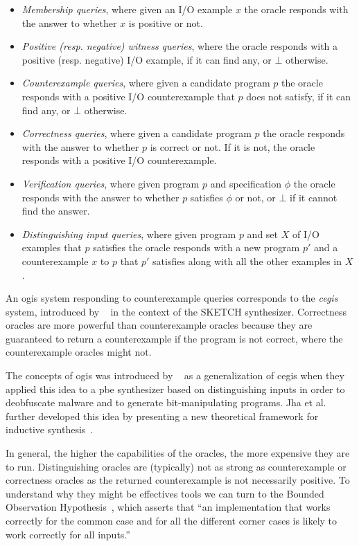 \begin{itemize}
\item \textit{Membership queries}, where given an I/O example $x$ the oracle
  responds with the answer to whether $x$ is positive or not.
\item \textit{Positive (resp. negative) witness queries}, where the oracle
  responds with a positive (resp. negative) I/O example, if it can find any, or
  $\bot$ otherwise.
\item \textit{Counterexample queries}, where given a candidate program $p$ the
  oracle responds with a positive I/O counterexample that $p$ does not satisfy,
  if it can find any, or $\bot$ otherwise.
\item \textit{Correctness queries}, where given a candidate program $p$ the
  oracle responds with the answer to whether $p$ is correct or not. If it is not,
  the oracle responds with a positive I/O counterexample.
\item \textit{Verification queries}, where given program $p$ and specification
  $\phi$ the oracle responds with the answer to whether $p$ satisfies $\phi$ or
  not, or $\bot$ if it cannot find the answer.
\item \textit{Distinguishing input queries}, where given program $p$ and set $X$
  of I/O examples that $p$ satisfies the oracle responds with a new program $p'$
  and a counterexample $x$ to $p$ that $p'$ satisfies along with all the other
  examples in $X$.
\end{itemize}

An \gls{ogis} system responding to counterexample queries corresponds to the
\textit{\gls{cegis}} system, introduced by
\citeauthor{Solar-Lezama:2008}~\cite{Solar-Lezama:2008} in the context of the
SKETCH synthesizer. Correctness oracles are more powerful than counterexample
oracles because they are guaranteed to return a counterexample if the program is
not correct, where the counterexample oracles might not.

The concepts of \gls{ogis} was introduced by
\citeauthor{Jha:oracle:2010}~\cite{Jha:oracle:2010} as a generalization of
\gls{cegis} when they applied this idea to a \gls{pbe} synthesizer based on
distinguishing inputs in order to deobfuscate malware and to generate
bit-manipulating programs.
Jha et al. further developed this idea by presenting a new theoretical framework
for inductive synthesis~\cite{Jha:2017:TFS}.

In general, the higher the capabilities of the oracles, the more expensive they
are to run. Distinguishing oracles are (typically) not as strong as
counterexample or correctness oracles as the returned counterexample is not
necessarily positive. To understand why they might be effectives tools we can
turn to the Bounded Observation Hypothesis~\cite{Solar-Lezama:2008}, which
asserts that ``an implementation that works correctly for the common case and
for all the different corner cases is likely to work correctly for all inputs.''

